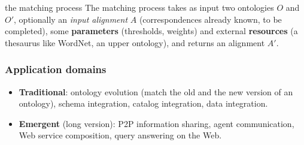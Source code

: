 \begin{nbfact}{the matching process}
The matching process takes as input two ontologies $O$ and $O'$, optionally an
\emph{input alignment} $A$ (correspondences already known, to be completed), some
\textbf{parameters} (thresholds, weights) and external \textbf{resources} (a thesaurus
like WordNet, an upper ontology), and returns an alignment $A'$.
\end{nbfact}

\subsubsection{Application domains}

\begin{itemize}[nosep]
  \item \textbf{Traditional}: ontology evolution (match the old and the new version of
        an ontology), schema integration, catalog integration, data integration.
  \item \textbf{Emergent} (long version): P2P information sharing, agent communication,
        Web service composition, query answering on the Web.
\end{itemize}

